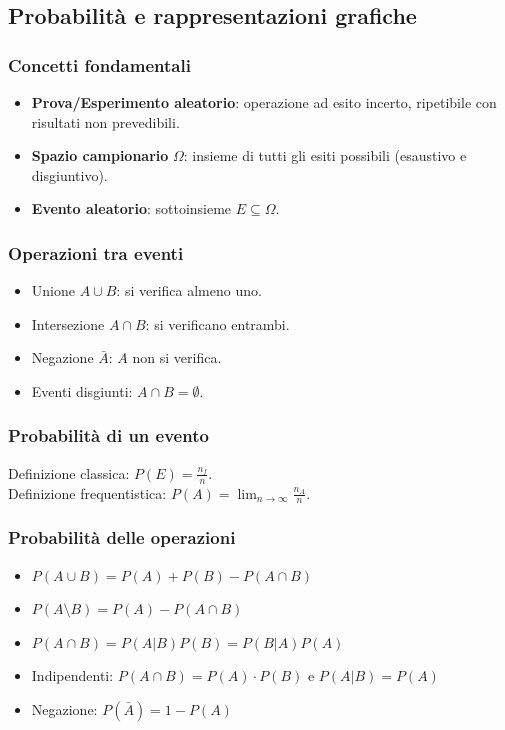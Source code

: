 \documentclass[a4paper,11pt]{article}
\begin{document}
\subsection{Probabilità e rappresentazioni grafiche}
\subsubsection{Concetti fondamentali}
\begin{itemize}
    \item \textbf{Prova/Esperimento aleatorio}: operazione ad esito incerto, ripetibile con risultati non prevedibili.
    \item \textbf{Spazio campionario} $\Omega$: insieme di tutti gli esiti possibili (esaustivo e disgiuntivo).
    \item \textbf{Evento aleatorio}: sottoinsieme $E \subseteq \Omega$.
\end{itemize}

\subsubsection{Operazioni tra eventi}
\begin{itemize}
    \item Unione $A \cup B$: si verifica almeno uno.
    \item Intersezione $A \cap B$: si verificano entrambi.
    \item Negazione $\bar{A}$: $A$ non si verifica.
    \item Eventi disgiunti: $A \cap B = \emptyset$.
\end{itemize}

\subsubsection{Probabilità di un evento}
Definizione classica: $P(E) = \frac{n_f}{n}$. \\
Definizione frequentistica: $P(A) = \lim_{n \to \infty} \frac{n_A}{n}$.

\subsubsection{Probabilità delle operazioni}
\begin{itemize}
    \item $P(A \cup B) = P(A) + P(B) - P(A \cap B)$
    \item $P(A \setminus B) = P(A) - P(A \cap B)$
    \item $P(A \cap B) = P(A|B)P(B) = P(B|A)P(A)$
    \item Indipendenti: $P(A \cap B) = P(A) \cdot P(B)$ e $P(A|B) = P(A)$
    \item Negazione: $P(\bar{A}) = 1 - P(A)$
\end{itemize}
\end{document}
